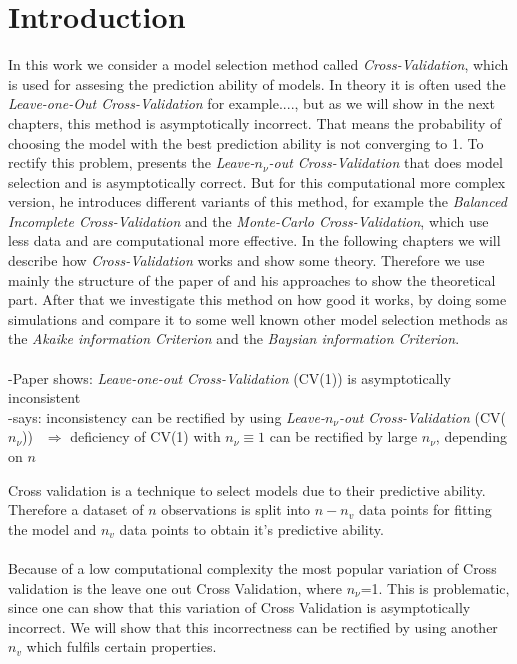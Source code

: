 \documentclass[Research_Module_ES.tex]{subfiles}
\begin{document}
\section{Introduction}	
In this work we consider a model selection method  called \textit{Cross-Validation}, which is used for assesing the prediction ability of models.
In theory it is often used the \textit{Leave-one-Out Cross-Validation}
for example...., but as we will show in the next chapters, this method is asymptotically incorrect.
That means the probability of choosing the model with the best prediction ability is not converging to 1.
To rectify this problem, \cite{shao} presents the \textit{Leave-$n_\nu$-out Cross-Validation} that does model selection and is asymptotically correct. But for this computational more complex version, he introduces different variants of this method, for example the \textit{Balanced Incomplete Cross-Validation} and the \textit{Monte-Carlo Cross-Validation}, which use less data and are computational more effective. In the following chapters we will describe how \textit{Cross-Validation} works and show some theory. Therefore we use mainly the structure of the paper of \cite{shao} and his approaches to show the theoretical part. After that we investigate this method on how good it works, by doing some simulations and compare it to some well known other model selection methods as the \textit{Akaike information Criterion} and the \textit{Baysian information Criterion}.\\\\


-Paper shows: \textit{Leave-one-out Cross-Validation} (CV(1)) is asymptotically inconsistent\\
-says: inconsistency can be rectified by using \textit{Leave-$n_\nu$-out Cross-Validation} (CV($n_\nu$))
$~~\Rightarrow$ deficiency of CV(1) with $n_\nu\equiv 1$ can be rectified by large $n_\nu$, depending on $n$


Cross validation is a technique to select models due to their predictive ability. Therefore a dataset of $n$ observations is split into $n-n_v$ data points for fitting the model and $n_v$ data points to obtain it's predictive ability.  \\
\\
Because of a low computational complexity the most popular variation of Cross validation is the leave one out Cross Validation, where $n_\nu$=1.
This is problematic, since one can show that this variation of Cross Validation is asymptotically incorrect. We will  show that this incorrectness can be rectified by using another $n_v$ which fulfils certain properties. 
\end{document}
